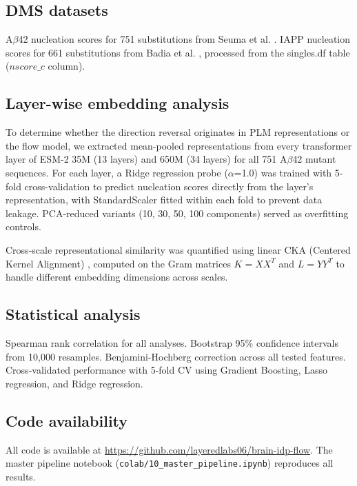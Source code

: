 \documentclass[10pt,letterpaper]{article}
\begin{document}
\subsection*{DMS datasets}

A$\beta$42 nucleation scores for 751 substitutions from Seuma et al. \cite{seuma2022}. IAPP nucleation scores for 661 substitutions from Badia et al. \cite{badia2026}, processed from the singles.df table ($nscore\_c$ column).

\subsection*{Layer-wise embedding analysis}

To determine whether the direction reversal originates in PLM representations or the flow model, we extracted mean-pooled representations from every transformer layer of ESM-2 35M (13 layers) and 650M (34 layers) for all 751 A$\beta$42 mutant sequences. For each layer, a Ridge regression probe ($\alpha$=1.0) was trained with 5-fold cross-validation to predict nucleation scores directly from the layer's representation, with StandardScaler fitted within each fold to prevent data leakage. PCA-reduced variants (10, 30, 50, 100 components) served as overfitting controls.

Cross-scale representational similarity was quantified using linear CKA (Centered Kernel Alignment) \cite{kornblith2019}, computed on the Gram matrices $K = XX^T$ and $L = YY^T$ to handle different embedding dimensions across scales.

\subsection*{Statistical analysis}

Spearman rank correlation for all analyses. Bootstrap 95\% confidence intervals from 10,000 resamples. Benjamini-Hochberg correction across all tested features. Cross-validated performance with 5-fold CV using Gradient Boosting, Lasso regression, and Ridge regression.

\subsection*{Code availability}

All code is available at \url{https://github.com/layeredlabs06/brain-idp-flow}. The master pipeline notebook (\texttt{colab/10\_master\_pipeline.ipynb}) reproduces all results.
\end{document}
